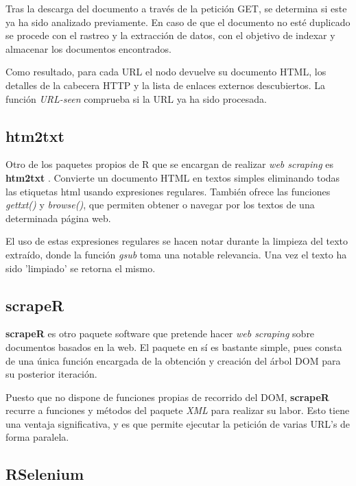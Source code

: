 Tras la descarga del documento a través de la petición GET, se determina si este ya ha sido analizado 
previamente. En caso de que el documento no esté duplicado se procede con el rastreo y la extracción de
datos, con el objetivo de indexar y almacenar los documentos encontrados.

Como resultado, para cada URL el nodo devuelve su documento HTML, los detalles de la cabecera HTTP y la 
lista de enlaces externos descubiertos. La función \emph{URL-seen} comprueba si la URL ya ha sido procesada.

\subsection{htm2txt}
\label{subsec:htm2txt}

Otro de los paquetes propios de R que se encargan de realizar \emph{web scraping} es \textbf{htm2txt} 
\cite{htm2txt-cran}. Convierte un documento HTML en textos simples eliminando todas las etiquetas html 
usando expresiones regulares. También ofrece las funciones \emph{gettxt()} y \emph{browse()}, que permiten 
obtener o navegar por los textos de una determinada página web.

El uso de estas expresiones regulares se hacen notar durante la limpieza del texto extraído, donde la
función \emph{gsub} toma una notable relevancia. Una vez el texto ha sido 'limpiado' se retorna el mismo.

\subsection{scrapeR}
\label{subsec:scraper}

\textbf{scrapeR} \cite{scraper-cran} es otro paquete software que pretende hacer \emph{web scraping} sobre 
documentos basados en la web. El paquete en sí es bastante simple, pues consta de una única función 
encargada de la obtención y creación del árbol DOM para su posterior iteración.

Puesto que no dispone de funciones propias de recorrido del DOM, \textbf{scrapeR} recurre a funciones y
métodos del paquete \emph{XML} para realizar su labor. Esto tiene una ventaja significativa, y es que
permite ejecutar la petición de varias URL's de forma paralela.

\subsection{RSelenium}
\label{subsec:rselenium}

